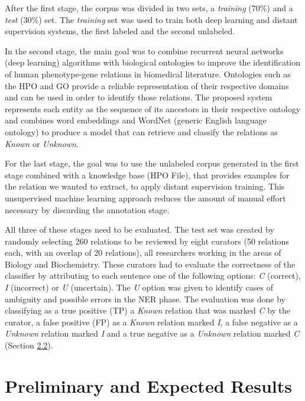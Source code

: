 \documentclass[11pt]{article}
\begin{document}
After the first stage, the corpus was divided in two sets, a \textit{training} (70\%) and a \textit{test} (30\%) set. The \textit{training} set was used to train both deep learning and distant supervision systems, the first labeled and the second unlabeled.

In the second stage, the main goal was to combine recurrent neural networks (deep learning) algorithms with biological ontologies to improve the identification of human phenotype-gene relations in biomedical literature. Ontologies such as the HPO and GO provide a reliable representation of their respective domains and can be used in order to identify those relations. The proposed system represents each entity as the sequence of its ancestors in their respective ontology and combines word embeddings and WordNet (generic English language ontology) to produce a model that can retrieve and classify the relations as \textit{Known} or \textit{Unknown}.

For the last stage, the goal was to use the unlabeled corpus generated in the first stage combined with a knowledge base (HPO File), that provides examples for the relation we wanted to extract, to apply distant supervision training. This unsupervised machine learning approach reduces the amount of manual effort necessary by discarding the annotation stage.

All three of these stages need to be evaluated. The test set was created by randomly selecting 260 relations to be reviewed by eight curators (50 relations each, with an overlap of 20 relations), all researchers working in the areas of Biology and Biochemistry. These curators had to evaluate the correctness of the classifier by attributing to each sentence one of the following options: \textit{C} (correct), \textit{I} (incorrect) or \textit{U} (uncertain). The \textit{U} option was given to identify cases of ambiguity and possible errors in the NER phase. The evaluation was done by classifying as a true positive (TP) a \textit{Known} relation that was marked \textit{C} by the curator, a false positive (FP) as a \textit{Known} relation marked \textit{I}, a false negative as a \textit{Unknown} relation marked \textit{I} and a true negative as a \textit{Unknown} relation marked \textit{C} (Section \hyperlink{3}{2.2}).


\section{Preliminary and Expected Results}
\end{document}
